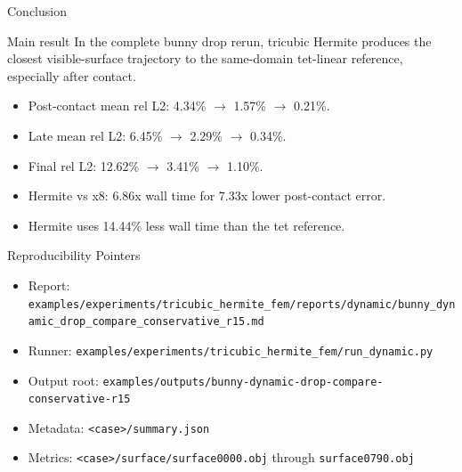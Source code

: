 \documentclass[aspectratio=169,10pt]{beamer}
\newcommand{\pct}[1]{#1\%}
\newcommand{\good}[1]{\textcolor{pgoGreen}{#1}}
\begin{document}
\begin{frame}{Conclusion}
  \small
  \begin{block}{Main result}
    In the complete bunny drop rerun, tricubic Hermite produces the closest
    visible-surface trajectory to the same-domain tet-linear reference,
    especially after contact.
  \end{block}

  \vspace{0.6em}
  \begin{itemize}
    \item Post-contact mean rel L2: \pct{4.34} $\rightarrow$ \pct{1.57} $\rightarrow$ \good{\pct{0.21}}.
    \item Late mean rel L2: \pct{6.45} $\rightarrow$ \pct{2.29} $\rightarrow$ \good{\pct{0.34}}.
    \item Final rel L2: \pct{12.62} $\rightarrow$ \pct{3.41} $\rightarrow$ \good{\pct{1.10}}.
    \item Hermite vs x8: 6.86x wall time for 7.33x lower post-contact error.
    \item Hermite uses 14.44\% less wall time than the tet reference.
  \end{itemize}
\end{frame}

\begin{frame}{Reproducibility Pointers}
  \scriptsize
  \begin{itemize}
    \item Report: \texttt{examples/experiments/tricubic\_hermite\_fem/reports/dynamic/bunny\_dynamic\_drop\_compare\_conservative\_r15.md}
    \item Runner: \texttt{examples/experiments/tricubic\_hermite\_fem/run\_dynamic.py}
    \item Output root: \texttt{examples/outputs/bunny-dynamic-drop-compare-conservative-r15}
    \item Metadata: \texttt{<case>/summary.json}
    \item Metrics: \texttt{<case>/surface/surface0000.obj} through \texttt{surface0790.obj}
  \end{itemize}
\end{frame}
\end{document}

